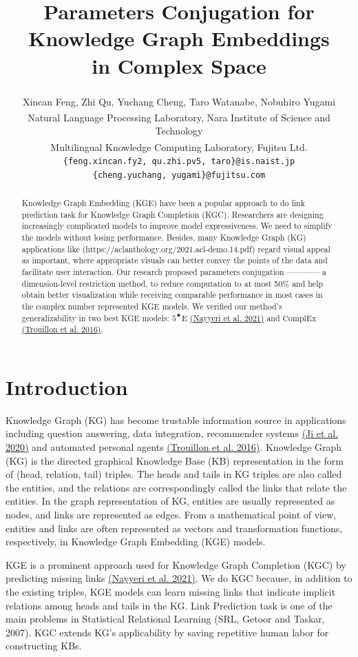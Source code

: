 \documentclass[11pt]{article}
\title{Parameters Conjugation for Knowledge Graph Embeddings \\ in Complex Space}
\author{
  Xincan Feng\textsuperscript{\dag \ddag}, Zhi Qu\textsuperscript{\dag}, Yuchang Cheng\textsuperscript{\ddag}, Taro Watanabe\textsuperscript{\dag}, Nobuhiro Yugami\textsuperscript{\ddag} \\
  \textsuperscript{\dag}Natural Language Processing Laboratory, Nara Institute of Science and Technology \\
  \textsuperscript{\ddag}Multilingual Knowledge Computing Laboratory, Fujitsu Ltd. \\
  \texttt{\{feng.xincan.fy2, qu.zhi.pv5, taro\}@is.naist.jp} \\
  \texttt{\{cheng.yuchang, yugami\}@fujitsu.com}\\
  }
\begin{document}
\maketitle
\begin{abstract}
Knowledge Graph Embedding (KGE) have been a popular approach to do link prediction task for Knowledge Graph Completion (KGC).
Researchers are designing increasingly complicated models to improve model expressiveness.
We need to simplify the models without losing performance.
Besides, many Knowledge Graph (KG) applications like (https://aclanthology.org/2021.acl-demo.14.pdf) regard visual appeal as important, where appropriate visuals can better convey the points of the data and facilitate user interaction.
Our research proposed parameters conjugation ———— a dimension-level restriction method, to reduce computation to at most 50\% and help obtain better visualization while receiving comparable performance in most cases in the complex number represented KGE models.
We verified our method's generalizability in two best KGE models: $5^{\bigstar}\mathrm{E}$
\hyperlink{Nay21}{(Nayyeri et al. 2021)}
\cite{Nayyeri_Vahdati_Aykul_Lehmann_2021}
and $\mathrm{ComplEx}$
\hyperlink{Tro16}{(Trouillon et al. 2016)}.
\end{abstract}

\section{Introduction}
Knowledge Graph (KG) has become trustable information source in applications including question answering, data integration, recommender systems 
\hyperlink{JiS20}{(Ji et al. 2020)} and automated personal agents
\hyperlink{Tro16}{(Trouillon et al. 2016)}.
Knowledge Graph (KG) is the directed graphical Knowledge Base (KB) representation in the form of (head, relation, tail) triples.
The heads and tails in KG triples are also called the entities, and the relations are correspondingly called the links that relate the entities.
In the graph representation of KG, entities are usually represented as nodes, and links are represented as edges.
From a mathematical point of view, entities and links are often represented as vectors and transformation functions, respectively, in Knowledge Graph Embedding (KGE) models.

KGE is a prominent approach used for Knowledge Graph Completion (KGC) by predicting missing links
\hyperlink{Nay21}{(Nayyeri et al. 2021)}.
We do KGC because, in addition to the existing triples, KGE models can learn missing links that indicate implicit relations among heads and tails in the KG.
Link Prediction task is one of the main problems in Statistical Relational Learning (SRL, Getoor and Taskar, 2007).
KGC extends KG's applicability by saving repetitive human labor for constructing KBs.
\end{document}
